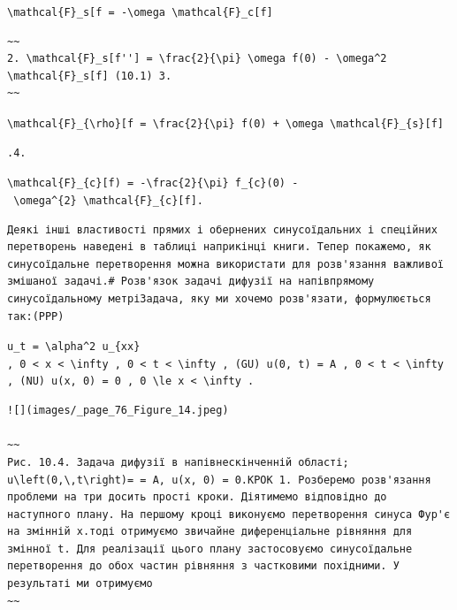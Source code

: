\documentclass[
  ukrainian,
]{article}
\begin{document}
\texttt{\textbackslash{}mathcal\{F\}\_s{[}f\textquotesingle{}{]}\ =\ -\textbackslash{}omega\ \textbackslash{}mathcal\{F\}\_c{[}f{]}}

\begin{verbatim}
~~
2. \mathcal{F}_s[f''] = \frac{2}{\pi} \omega f(0) - \omega^2 \mathcal{F}_s[f] (10.1) 3.
~~
\end{verbatim}

\texttt{\textbackslash{}mathcal\{F\}\_\{\textbackslash{}rho\}{[}f\textquotesingle{}{]}\ =\ \textbackslash{}frac\{2\}\{\textbackslash{}pi\}\ f(0)\ +\ \textbackslash{}omega\ \textbackslash{}mathcal\{F\}\_\{s\}{[}f{]}}

\begin{verbatim}
.4.
\end{verbatim}

\texttt{\textbackslash{}mathcal\{F\}\_\{c\}{[}f\textquotesingle{}\textquotesingle{})\ =\ -\textbackslash{}frac\{2\}\{\textbackslash{}pi\}\ f\_\{c\}(0)\ -\ \textbackslash{}omega\^{}\{2\}\ \textbackslash{}mathcal\{F\}\_\{c\}{[}f{]}.}

\begin{verbatim}
Деякі інші властивості прямих і обернених синусоїдальних і спеційних перетворень наведені в таблиці наприкінці книги. Тепер покажемо, як синусоїдальне перетворення можна використати для розв'язання важливої змішаної задачі.# Розв'язок задачі дифузії на напівпрямому синусоїдальному метріЗадача, яку ми хочемо розв'язати, формулюється так:(PPP)
\end{verbatim}

\texttt{u\_t\ =\ \textbackslash{}alpha\^{}2\ u\_\{xx\}}
\texttt{,\ 0\ \textless{}\ x\ \textless{}\ \textbackslash{}infty\ ,\ 0\ \textless{}\ t\ \textless{}\ \textbackslash{}infty\ ,\ (GU)\ u(0,\ t)\ =\ A\ ,\ 0\ \textless{}\ t\ \textless{}\ \textbackslash{}infty\ ,\ (NU)\ u(x,\ 0)\ =\ 0\ ,\ 0\ \textbackslash{}le\ x\ \textless{}\ \textbackslash{}infty\ .}

\begin{verbatim}
![](images/_page_76_Figure_14.jpeg)

~~
Рис. 10.4. Задача дифузії в напівнескінченній області; u\left(0,\,t\right)= = A, u(x, 0) = 0.КРОК 1. Розберемо розв'язання проблеми на три досить прості кроки. Діятимемо відповідно до наступного плану. На першому кроці виконуємо перетворення синуса Фур'є на змінній x.тоді отримуємо звичайне диференціальне рівняння для змінної t. Для реалізації цього плану застосовуємо синусоїдальне перетворення до обох частин рівняння з частковими похідними. У результаті ми отримуємо
~~
\end{verbatim}
\end{document}
